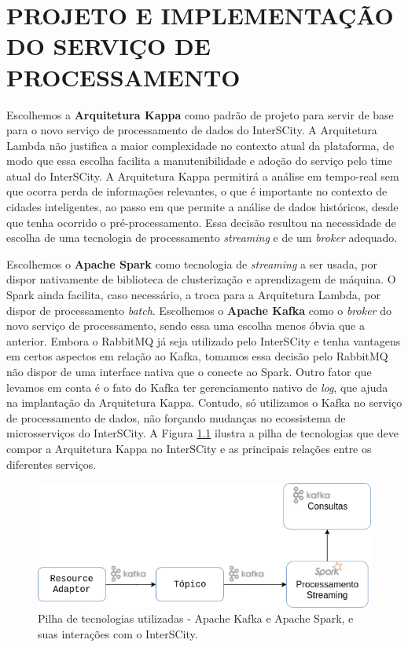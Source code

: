 \chapter[PROJETO E IMPLEMENTAÇÃO DO SERVIÇO DE PROCESSAMENTO]{PROJETO E IMPLEMENTAÇÃO DO SERVIÇO DE PROCESSAMENTO}

\label{chapter:architecture}

Escolhemos a \textbf{Arquitetura Kappa} como padrão de projeto para servir
de base para o novo serviço de processamento de dados do InterSCity.
A Arquitetura Lambda não justifica a maior complexidade no contexto atual da
plataforma, de modo que essa escolha facilita a manutenibilidade e adoção do
serviço pelo time atual do InterSCity. A Arquitetura Kappa permitirá a análise
em tempo-real sem que ocorra perda de informações relevantes, o que é
importante no contexto de cidades inteligentes, ao passo em que permite a
análise de dados históricos, desde que tenha ocorrido o pré-processamento.
Essa decisão resultou na necessidade de escolha de uma tecnologia de
processamento \textit{streaming} e de um \textit{broker} adequado.

Escolhemos o \textbf{Apache Spark} como tecnologia de \textit{streaming}
a ser usada, por dispor nativamente de biblioteca de clusterização
e aprendizagem de máquina. O Spark ainda facilita, caso necessário, a
troca para a Arquitetura Lambda, por dispor de processamento \textit{batch}.
Escolhemos o \textbf{Apache Kafka} como o \textit{broker} do novo serviço de
processamento, sendo essa uma escolha menos óbvia que a anterior. Embora o
RabbitMQ já seja utilizado pelo InterSCity e tenha vantagens em certos aspectos
em relação ao Kafka, tomamos essa decisão pelo RabbitMQ não dispor de uma
interface nativa que o conecte ao Spark. Outro fator que levamos em conta é o
fato do Kafka ter gerenciamento nativo de \textit{log}, que ajuda na
implantação da Arquitetura Kappa. Contudo, só utilizamos o Kafka no serviço
de processamento de dados, não forçando mudanças no ecossistema de
microsserviços do InterSCity. A Figura \ref{fig:stack} ilustra a pilha de
tecnologias que deve compor a Arquitetura Kappa no InterSCity e as principais
relações entre os diferentes serviços.

\begin{figure}
  \centering
    \includegraphics[scale=0.5]{figuras/kappa_tools2.png}
  \caption{Pilha de tecnologias utilizadas - Apache Kafka e Apache Spark, e suas
    interações com o InterSCity.}
  \label{fig:stack}
\end{figure}

